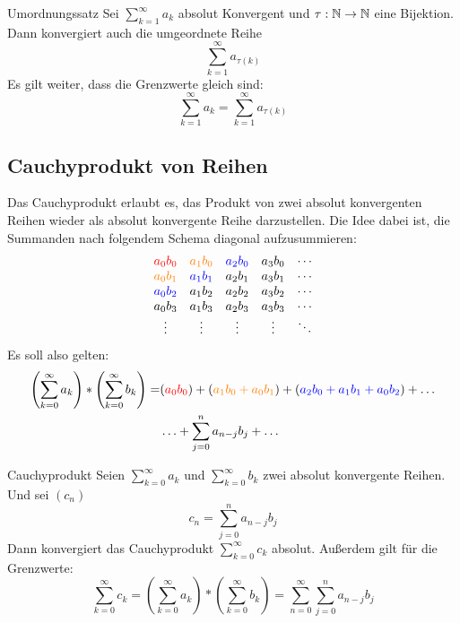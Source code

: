 \begin{satz}{Umordnungssatz}
	Sei $\sum_{k=1}^\infty a_k$ absolut Konvergent und $\tau:\mathbb{N}\rightarrow\mathbb{N}$ eine Bijektion.
	Dann konvergiert auch die umgeordnete Reihe
	\begin{equation*}
		\sum\limits_{k=1}^\infty a_{\tau(k)}
	\end{equation*}
	Es gilt weiter, dass die Grenzwerte gleich sind:
	\begin{equation*}
		\sum_{k=1}^\infty a_k=\sum\limits_{k=1}^\infty a_{\tau(k)}
	\end{equation*}
\end{satz}

\subsection{Cauchyprodukt von Reihen}
Das Cauchyprodukt erlaubt es, das Produkt von zwei absolut konvergenten Reihen wieder als absolut konvergente Reihe darzustellen. Die Idee dabei ist, die Summanden nach folgendem Schema diagonal aufzusummieren:
\begin{equation*}
	\begin{array}{ccccc}
		\color{red}a_0b_0 & \color{orange}a_1b_0 & \color{blue}a_2b_0 & a_3b_0 & \cdots\\
		\color{orange}a_0b_1 & \color{blue}a_1b_1 & a_2b_1 & a_3b_1 & \cdots\\
		\color{blue}a_0b_2 & a_1b_2 & a_2b_2 & a_3b_2 & \cdots\\
		a_0b_3 & a_1b_3 & a_2b_3 & a_3b_3 & \cdots\\
		\vdots & \vdots & \vdots & \vdots & \ddots
	\end{array}
\end{equation*}
Es soll also gelten:
\begin{align*}
	\left(\sum\limits_{k=0}^\infty a_k\right)*\left(\sum\limits_{k=0}^\infty b_k\right)
	= &({\color{red} a_0b_0})+({\color{orange} a_1b_0+a_0b_1})+({\color{blue} a_2b_0+a_1b_1+a_0b_2})+\ldots\\
	&\ldots+\sum\limits_{j=0}^n a_{n-j}b_j+\ldots
\end{align*}

\begin{satz}{Cauchyprodukt}
	Seien $\sum_{k=0}^\infty a_k$ und $\sum_{k=0}^\infty b_k$ zwei absolut konvergente Reihen. Und sei $(c_n)$
	\begin{equation*}
		c_n=\sum\limits_{j=0}^n a_{n-j}b_j
	\end{equation*}
	Dann konvergiert das Cauchyprodukt $\sum_{k=0}^\infty c_k$ absolut. Außerdem gilt für die Grenzwerte:
	\begin{equation*}
		\sum\limits_{k=0}^\infty c_k
		= \left(\sum\limits_{k=0}^\infty a_k\right)*\left(\sum\limits_{k=0}^\infty b_k\right)
		= \sum\limits_{n=0}^\infty \sum\limits_{j=0}^n a_{n-j}b_j
	\end{equation*}
\end{satz}

